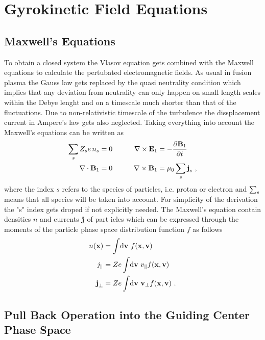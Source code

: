 \newpage
\section{Gyrokinetic Field Equations}
\label{sec:fields}

\subsection{Maxwell's Equations}
\label{sub:maxwellEquations}

To obtain a closed system the Vlasov equation gets combined with the Maxwell equations to calculate the pertubated electromagnetic fields. As usual in fusion plasma the Gauss law gets replaced by the quasi neutrality condition which implies that any deviation from neutrality can only happen on small length scales within the Debye lenght and on a timescale much shorter than that of the fluctuations. Due to non-relativistic timescale of the turbulence the dissplacement current in Ampere's law gets also neglected. Taking everything into account the Maxwell's equations can be written as
\begin{gather}
	\begin{aligned}
		\sum_s Z_s e \, n_s &= 0  &\qquad \nabla \times \boldsymbol{\mathbf{E}}_1 &= - \frac{\partial \boldsymbol{\mathbf{B}}_1}{\partial t}\\
		\nabla \cdot \boldsymbol{\mathbf{B}}_1 &= 0 &\qquad \nabla \times \boldsymbol{\mathbf{B}}_1 &= \mu_0 \sum_s \boldsymbol{\mathbf{j}}_s~,
	\end{aligned}
	\label{eq:maxwellEquations}
\end{gather}
where the index $s$ refers to the species of particles, i.e. proton or electron and $\sum_s$ means that all species will be taken into account. For simplicity of the derivation the "s" index gets droped if not explicitly needed. The Maxwell's equation contain densities $n$ and currents $\boldsymbol{\mathbf{j}}$ of part icles which can be expressed through the moments of the particle phase space distribution function $f$ as follows
\begin{gather}
	\begin{aligned}
		n(\boldsymbol{\mathbf{x}}) &= \int \! \mathrm{d}\boldsymbol{\mathbf{v}} ~ f(\boldsymbol{\mathbf{x}}, \boldsymbol{\mathbf{v}}) \\
		j_\parallel &= Ze \int \! \mathrm{d}\boldsymbol{\mathbf{v}} ~ v_\parallel f(\boldsymbol{\mathbf{x}}, \boldsymbol{\mathbf{v}}) \\
		\boldsymbol{\mathbf{j}}_\perp &= Ze \int \! \mathrm{d}\boldsymbol{\mathbf{v}} ~ \boldsymbol{\mathbf{v}}_\perp f(\boldsymbol{\mathbf{x}}, \boldsymbol{\mathbf{v}})~.
	\end{aligned}
	\label{eq:momentsParticleSpace}
\end{gather}
\newpage

\subsection{Pull Back Operation into the Guiding Center Phase Space}
\label{sub:pullback}


